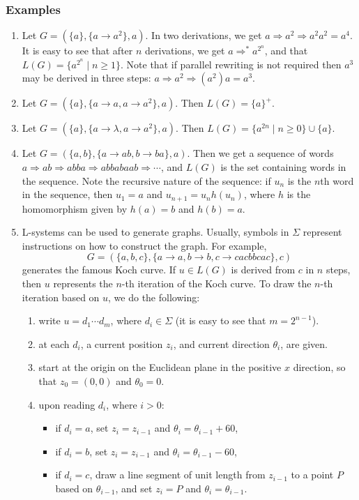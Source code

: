 \documentclass[12pt]{article}
\begin{document}
\subsubsection*{Examples}
\begin{enumerate}
\item Let $G=(\lbrace a\rbrace, \lbrace a\to a^2\rbrace, a)$.  In two derivations, we get $a\Rightarrow a^2 \Rightarrow a^2a^2 = a^4$.  It is easy to see that after $n$ derivations, we get $a\Rightarrow^* a^{2^n}$, and that $L(G)=\lbrace a^{2^n} \mid n\ge 1\rbrace$.  Note that if parallel rewriting is not required then $a^3$ may be derived in three steps: $a\Rightarrow a^2 \Rightarrow (a^2)a=a^3$.
\item Let $G=(\lbrace a\rbrace, \lbrace a\to a, a\to a^2\rbrace, a)$.  Then $L(G)=\lbrace a\rbrace^+$.
\item Let $G=(\lbrace a\rbrace, \lbrace a\to \lambda, a\to a^2\rbrace, a)$.  Then $L(G)=\lbrace a^{2n}\mid n\ge 0\rbrace \cup \lbrace a\rbrace$.
\item Let $G=(\lbrace a,b\rbrace, \lbrace a\to ab, b\to ba\rbrace, a)$.  Then we get a sequence of words $a\Rightarrow ab \Rightarrow abba \Rightarrow abbabaab \Rightarrow \cdots $, and $L(G)$ is the set containing words in the sequence.  Note the recursive nature of the sequence: if $u_n$ is the $n$th word in the sequence, then $u_1 = a$ and $u_{n+1}=u_n h(u_n)$, where $h$ is the homomorphism given by $h(a)=b$ and $h(b)=a$.
\item L-systems can be used to generate graphs.  Usually, symbols in $\Sigma$ represent instructions on how to construct the graph.  For example, $$G=(\lbrace a,b,c\rbrace, \lbrace a\to a, b\to b, c\to cacbbcac \rbrace, c)$$ generates the famous Koch curve.  If $u \in L(G)$ is derived from $c$ in $n$ steps, then $u$ represents the $n$-th iteration of the Koch curve.  To draw the $n$-th iteration based on $u$, we do the following: 
\begin{enumerate}
\item write $u=d_1\cdots d_m$, where $d_i\in \Sigma$ (it is easy to see that $m=2^{n-1}$).
\item at each $d_i$, a current position $z_i$, and current direction $\theta_i$, are given.
\item start at the origin on the Euclidean plane in the positive $x$ direction, so that $z_0=(0,0)$ and $\theta_0=0$.
\item upon reading $d_i$, where $i>0$:
\begin{itemize}
\item if $d_i=a$, set $z_i = z_{i-1}$ and $\theta_i = \theta_{i-1}+60$,
\item if $d_i=b$, set $z_i = z_{i-1}$ and $\theta_i = \theta_{i-1}-60$,
\item if $d_i=c$, draw a line segment of unit length from $z_{i-1}$ to a point $P$ based on $\theta_{i-1}$, and set  $z_i=P$ and $\theta_i=\theta_{i-1}$.
\end{itemize}
\end{enumerate}
\end{enumerate}
\end{document}
